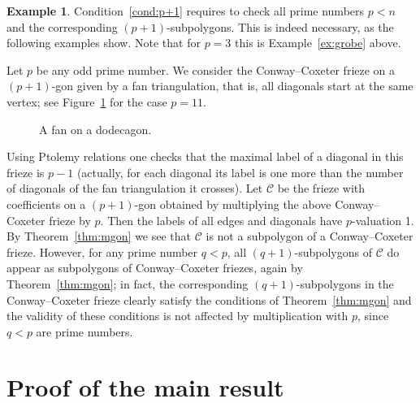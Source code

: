 \documentclass[10pt]{amsart}
\numberwithin{equation}{section}
\theoremstyle{definition}
\newtheorem{exam}[theo]{Example}
\theoremstyle{remark}
\begin{document}
\begin{exam} \label{ex:p+1}
Condition~\eqref{cond:p+1} requires to check all prime numbers $p<n$ and the
corresponding $(p+1)$-subpolygons. This is indeed necessary, as the following 
examples show. Note that for $p=3$ this is Example~\ref{ex:grobe}
above. 

Let $p$ be any odd prime number. We consider the Conway--Coxeter frieze
on a $(p+1)$-gon given by a fan triangulation,
that is, all diagonals start
at the same vertex; see Figure~\ref{fig:fan} for the case $p=11$. 

\begin{figure}[htb]\centering
{}
 \caption{A fan on a dodecagon. 
 \label{fig:fan}}
\end{figure}

Using Ptolemy relations one checks that the maximal label of a diagonal 
in this frieze is $p-1$ (actually, for each diagonal its label is one more
than the number of diagonals of the fan triangulation it crosses). 
Let $\mathcal{C}$ be the frieze with coefficients
on a $(p+1)$-gon obtained by multiplying the above Conway--Coxeter frieze
by $p$. Then the labels of all edges and diagonals have $p$-valuation 1.
By Theorem~\ref{thm:mgon} we see that $\mathcal{C}$ is not a subpolygon 
of a Conway--Coxeter frieze. However, for any prime number $q<p$, all 
$(q+1)$-subpolygons of $\mathcal{C}$ do appear as subpolygons of Conway--Coxeter
friezes, again by Theorem~\ref{thm:mgon}; in fact, the corresponding 
$(q+1)$-subpolygons in the Conway--Coxeter frieze clearly satisfy the conditions
of Theorem~\ref{thm:mgon} and the validity of these conditions is not 
affected by multiplication with $p$, since $q<p$ are prime numbers. 
\end{exam}



\section{Proof of the main result}
\label{sec:proof}
\end{document}
